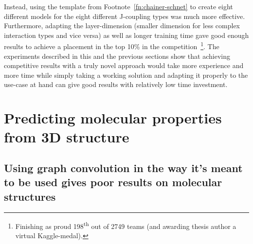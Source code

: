 Instead, using the template from Footnote~\ref{fn:chainer-schnet} to create eight different models for the eight different J-coupling types was much more effective. Furthermore, adapting the layer-dimension (smaller dimension for less complex interaction types and vice versa) as well as longer training time gave good enough results to achieve a placement in the top 10\% in the competition~\footnote{Finishing as proud 198\textsuperscript{th} out of 2749 teams (and awarding thesis author a virtual Kaggle-medal).}. The experiments described in this and the previous sections show that achieving competitive results with a truly novel approach would take more experience and more time while simply taking a working solution and adapting it properly to the use-case at hand can give good results with relatively low time investment.


\section{Predicting molecular properties from 3D structure}
\label{sec:alchemy}

\subsection{Using graph convolution in the way it's meant to be used gives poor results on molecular structures}
\label{sec:neighborhood-expansion}

